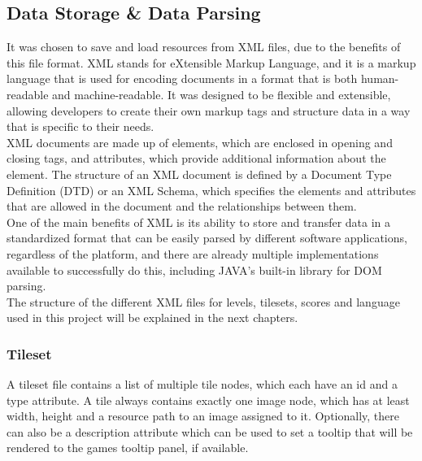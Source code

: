 \subsection{Data Storage \& Data Parsing}\label{subsec:data-storage-&-data-parsing}
It was chosen to save and load resources from XML files, due to the benefits of this file format.
XML stands for eXtensible Markup Language, and it is a markup language that is used for encoding documents in a format that is both human-readable and machine-readable.
It was designed to be flexible and extensible, allowing developers to create their own markup tags and structure data in a way that is specific to their needs.
\\
XML documents are made up of elements, which are enclosed in opening and closing tags, and attributes, which provide additional information about the element.
The structure of an XML document is defined by a Document Type Definition (DTD) or an XML Schema, which specifies the elements and attributes that are allowed in the document and the relationships between them.
\\
One of the main benefits of XML is its ability to store and transfer data in a standardized format that can be easily parsed by different software applications, regardless of the platform, and there are
already multiple implementations available to successfully do this, including JAVA's built-in library for DOM parsing.
\\
The structure of the different XML files for levels, tilesets, scores and language used in this project will be explained in the next chapters.
\subsubsection{Tileset}\label{subsubsec:tileset}
A tileset file contains a list of multiple tile nodes, which each have an id and a type attribute.
A tile always contains exactly one image node, which has at least width, height and a resource path to an image assigned to it.
Optionally, there can also be a description attribute which can be used to set a tooltip that will be rendered to the games tooltip panel, if available.
\\ \\
